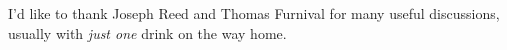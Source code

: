 
\begin{acknowledgements}      


I'd like to thank Joseph Reed and Thomas Furnival for many useful discussions, usually with \emph{just one} drink on the way home.


\end{acknowledgements}

